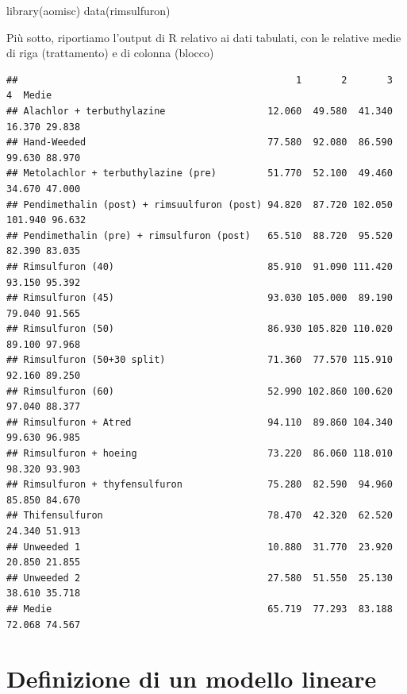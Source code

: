 \documentclass[a4paper,12pt,oneside]{book}
\newenvironment{Shaded}{}{}
\newcommand{\KeywordTok}[1]{#1}
\newcommand{\NormalTok}[1]{#1}
\begin{document}
\begin{Shaded}
\begin{Highlighting}[]
\KeywordTok{library}\NormalTok{(aomisc)}
\KeywordTok{data}\NormalTok{(rimsulfuron)}
\end{Highlighting}
\end{Shaded}

Più sotto, riportiamo l'output di R relativo ai dati tabulati, con le relative medie di riga (trattamento) e di colonna (blocco)

\scriptsize

\begin{verbatim}
##                                                 1       2       3       4  Medie
## Alachlor + terbuthylazine                  12.060  49.580  41.340  16.370 29.838
## Hand-Weeded                                77.580  92.080  86.590  99.630 88.970
## Metolachlor + terbuthylazine (pre)         51.770  52.100  49.460  34.670 47.000
## Pendimethalin (post) + rimsuulfuron (post) 94.820  87.720 102.050 101.940 96.632
## Pendimethalin (pre) + rimsulfuron (post)   65.510  88.720  95.520  82.390 83.035
## Rimsulfuron (40)                           85.910  91.090 111.420  93.150 95.392
## Rimsulfuron (45)                           93.030 105.000  89.190  79.040 91.565
## Rimsulfuron (50)                           86.930 105.820 110.020  89.100 97.968
## Rimsulfuron (50+30 split)                  71.360  77.570 115.910  92.160 89.250
## Rimsulfuron (60)                           52.990 102.860 100.620  97.040 88.377
## Rimsulfuron + Atred                        94.110  89.860 104.340  99.630 96.985
## Rimsulfuron + hoeing                       73.220  86.060 118.010  98.320 93.903
## Rimsulfuron + thyfensulfuron               75.280  82.590  94.960  85.850 84.670
## Thifensulfuron                             78.470  42.320  62.520  24.340 51.913
## Unweeded 1                                 10.880  31.770  23.920  20.850 21.855
## Unweeded 2                                 27.580  51.550  25.130  38.610 35.718
## Medie                                      65.719  77.293  83.188  72.068 74.567
\end{verbatim}

\normalsize

\hypertarget{definizione-di-un-modello-lineare-1}{%
\section{Definizione di un modello lineare}\label{definizione-di-un-modello-lineare-1}}
\end{document}

